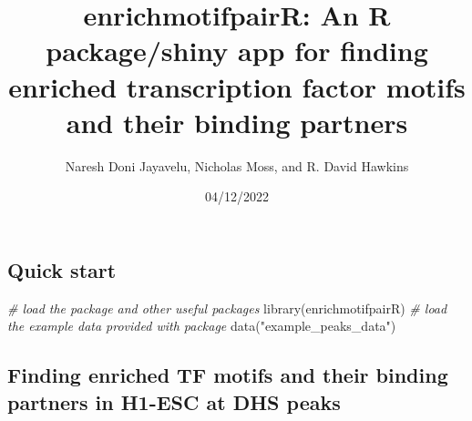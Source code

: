 \documentclass[
]{article}
\title{enrichmotifpairR: An R package/shiny app for finding enriched
transcription factor motifs and their binding partners}
\author{Naresh Doni Jayavelu, Nicholas Moss, and R. David Hawkins}
\date{04/12/2022}
\newenvironment{Shaded}{}{}
\newcommand{\AttributeTok}[1]{\textcolor[rgb]{0.49,0.56,0.16}{#1}}
\newcommand{\CommentTok}[1]{\textcolor[rgb]{0.38,0.63,0.69}{\textit{#1}}}
\newcommand{\FloatTok}[1]{\textcolor[rgb]{0.25,0.63,0.44}{#1}}
\newcommand{\FunctionTok}[1]{\textcolor[rgb]{0.02,0.16,0.49}{#1}}
\newcommand{\NormalTok}[1]{#1}
\newcommand{\OtherTok}[1]{\textcolor[rgb]{0.00,0.44,0.13}{#1}}
\newcommand{\SpecialCharTok}[1]{\textcolor[rgb]{0.25,0.44,0.63}{#1}}
\newcommand{\StringTok}[1]{\textcolor[rgb]{0.25,0.44,0.63}{#1}}
\begin{document}
\maketitle

{
\setcounter{tocdepth}{2}
\tableofcontents
}
\hypertarget{quick-start}{%
\subsection{Quick start}\label{quick-start}}

\begin{Shaded}
\begin{Highlighting}[]
\CommentTok{\# load the package and other useful packages}
\FunctionTok{library}\NormalTok{(enrichmotifpairR)}
\CommentTok{\# load the example data provided with package}
\FunctionTok{data}\NormalTok{(}\StringTok{"example\_peaks\_data"}\NormalTok{)}
\end{Highlighting}
\end{Shaded}

\hypertarget{finding-enriched-tf-motifs-and-their-binding-partners-in-h1-esc-at-dhs-peaks}{%
\subsection{Finding enriched TF motifs and their binding partners in
H1-ESC at DHS
peaks}\label{finding-enriched-tf-motifs-and-their-binding-partners-in-h1-esc-at-dhs-peaks}}

\begin{Shaded}
\end{Shaded}
\end{document}
